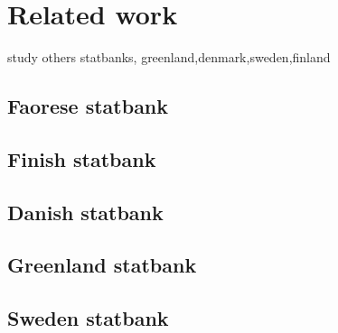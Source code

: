 \chapter{Related work}
study others statbanks, greenland,denmark,sweden,finland
\section{Faorese statbank}
\section{Finish statbank}
\section{Danish statbank}
\section{Greenland statbank}
\section{Sweden statbank}